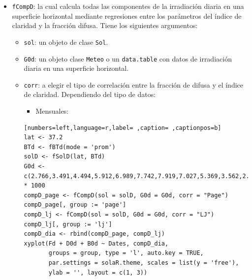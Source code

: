 \begin{itemize}
\item \texttt{fCompD}: la cual calcula todas las componentes de la irradiación diaria en una superficie horizontal mediante regresiones entre los parámetros del índice de claridad y la fracción difusa.
Tiene los siguientes argumentos:
\begin{itemize}
\item \texttt{sol}: un objeto de clase \texttt{Sol}.
\item \texttt{G0d}: un objeto clase \texttt{Meteo} o un \texttt{data.table} con datos de irradiación diaria en una superficie horizontal.
\item \texttt{corr}: a elegir el tipo de correlación entre la fracción de difusa y el índice de claridad.
Dependiendo del tipo de datos:
\begin{itemize}
\item Mensuales:
\end{itemize}
\begin{lstlisting}[numbers=left,language=r,label= ,caption= ,captionpos=b]
lat <- 37.2
BTd <- fBTd(mode = 'prom')
solD <- fSolD(lat, BTd)
G0d <- c(2.766,3.491,4.494,5.912,6.989,7.742,7.919,7.027,5.369,3.562,2.814,2.179) * 1000
compD_page <- fCompD(sol = solD, G0d = G0d, corr = "Page")
compD_page[, group := 'page']
compD_lj <- fCompD(sol = solD, G0d = G0d, corr = "LJ")
compD_lj[, group := 'lj']
compD_dia <- rbind(compD_page, compD_lj)
xyplot(Fd + D0d + B0d ~ Dates, compD_dia,
       groups = group, type = 'l', auto.key = TRUE,
       par.settings = solaR.theme, scales = list(y = 'free'),
       ylab = '', layout = c(1, 3))

\end{lstlisting}


\end{itemize}
\end{itemize}
